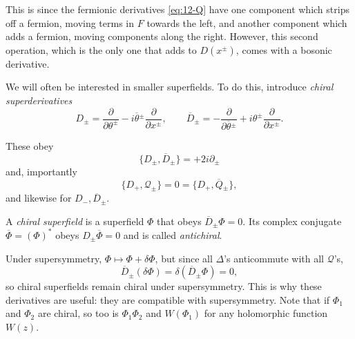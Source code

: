This is since the fermionic derivatives \eqref{eq:12-Q} have one component which strips off a fermion, moving terms in $F$ towards the left, and another component which adds a fermion, moving components along the right.
However, this second operation, which is the only one that adds to $D(x^{\pm})$, comes with a bosonic derivative.
\begin{definition}
  We will often be interested in smaller superfields. To do this, introduce \emph{chiral superderivatives}
  \begin{equation}
    D_{\pm} = \frac{\partial }{\partial \theta^{\pm}} - i \overline{\theta}{}^{\pm} \frac{\partial }{\partial x^{\pm}}, \qquad \overline{D}{}_{\pm} = - \frac{\partial }{\partial \overline{\theta}{}^{\pm}} + i {\theta}^{\pm} \frac{\partial }{\partial x^{\pm}}.
  \end{equation}
\end{definition}
These obey
\begin{equation}
  \{D_{\pm}, \overline{D}{}_{\pm}\} = +2i \partial_{\pm}
\end{equation}
and, importantly
\begin{equation}
  \{D_+, \mathcal{Q}_{\pm}\} = 0 = \{D_+, \overline{Q}{}_{\pm}\},
\end{equation}
and likewise for $D_-, \overline{D}{}_{\pm}$.
\begin{definition}
  A \emph{chiral superfield} is a superfield $\Phi$ that obeys $\overline{D}{}_{\pm} \Phi = 0$.
  Its complex conjugate $\overline{\Phi}{} = (\Phi)^*$ obeys $D_{\pm} \overline{\Phi}{} = 0$ and is called \emph{antichiral}.
\end{definition}
Under supersymmetry, $\Phi \mapsto \Phi + \delta \Phi$, but since all $\Delta$'s anticommute with all $\mathcal{Q}$'s,
\begin{equation}
  \overline{D}{}_{\pm} (\delta \Phi) = \delta (\overline{D}{}_{\pm} \Phi) = 0,
\end{equation}
so chiral superfields remain chiral under supersymmetry.
This is why these derivatives are useful: they are compatible with supersymmetry.
Note that if $\Phi_1$ and $\Phi_2$ are chiral, so too is $\Phi_1 \Phi_2$ and $W(\Phi_1)$ for any holomorphic function $W(z)$.


